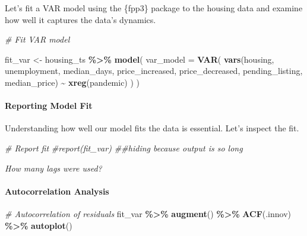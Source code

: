 \documentclass[
]{article}
\newenvironment{Shaded}{\begin{snugshade}}{\end{snugshade}}
\newcommand{\AttributeTok}[1]{\textcolor[rgb]{0.13,0.29,0.53}{#1}}
\newcommand{\CommentTok}[1]{\textcolor[rgb]{0.56,0.35,0.01}{\textit{#1}}}
\newcommand{\FunctionTok}[1]{\textcolor[rgb]{0.13,0.29,0.53}{\textbf{#1}}}
\newcommand{\NormalTok}[1]{#1}
\newcommand{\OtherTok}[1]{\textcolor[rgb]{0.56,0.35,0.01}{#1}}
\newcommand{\SpecialCharTok}[1]{\textcolor[rgb]{0.81,0.36,0.00}{\textbf{#1}}}
\begin{document}
Let's fit a VAR model using the \{fpp3\} package to the housing data and
examine how well it captures the data's dynamics.

\begin{Shaded}
\begin{Highlighting}[]
\CommentTok{\# Fit VAR model}

\NormalTok{fit\_var }\OtherTok{\textless{}{-}}\NormalTok{ housing\_ts }\SpecialCharTok{\%\textgreater{}\%}
  \FunctionTok{model}\NormalTok{(}
    \AttributeTok{var\_model =} \FunctionTok{VAR}\NormalTok{(}
      \FunctionTok{vars}\NormalTok{(housing, unemployment, median\_days, price\_increased, price\_decreased, pending\_listing, median\_price) }\SpecialCharTok{\textasciitilde{}}
        \FunctionTok{xreg}\NormalTok{(pandemic)}
\NormalTok{      )}
\NormalTok{    )}
\end{Highlighting}
\end{Shaded}

\hypertarget{reporting-model-fit}{%
\paragraph{Reporting Model Fit}\label{reporting-model-fit}}

Understanding how well our model fits the data is essential. Let's
inspect the fit.

\begin{Shaded}
\begin{Highlighting}[]
\CommentTok{\# Report fit}
\CommentTok{\#report(fit\_var) \#\#hiding because output is so long}
\end{Highlighting}
\end{Shaded}

\emph{How many lags were used?}

\hypertarget{autocorrelation-analysis}{%
\paragraph{Autocorrelation Analysis}\label{autocorrelation-analysis}}

\begin{Shaded}
\begin{Highlighting}[]
\CommentTok{\# Autocorrelation of residuals}
\NormalTok{fit\_var }\SpecialCharTok{\%\textgreater{}\%}
  \FunctionTok{augment}\NormalTok{() }\SpecialCharTok{\%\textgreater{}\%}
\FunctionTok{ACF}\NormalTok{(.innov) }\SpecialCharTok{\%\textgreater{}\%}
  \FunctionTok{autoplot}\NormalTok{()}
\end{Highlighting}
\end{Shaded}
\end{document}
